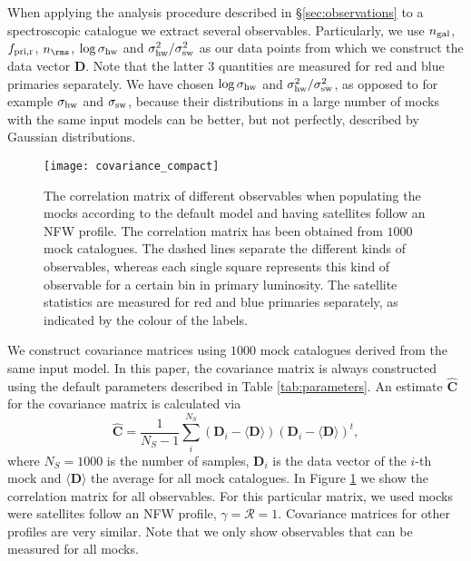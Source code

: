 \documentclass[fleqn,usenatbib,useAMS]{mnras}
\begin{document}
	When applying the analysis procedure described in \S\ref{sec:observations} to a spectroscopic catalogue we extract several observables. Particularly, we use $n_{\rm gal}$, $f_{\rm pri, r}$, $n_\rms$, $\log \sigma_{\rm hw}$ and $\sigma_{\rm hw}^2 / \sigma_{\rm sw}^2$ as our data points from which we construct the data vector $\boldsymbol{D}$. Note that the latter $3$ quantities are measured for red and blue primaries separately. We have chosen $\log \sigma_{\rm hw}$ and $\sigma_{\rm hw}^2 / \sigma_{\rm sw}^2$, as opposed to for example $\sigma_{\rm hw}$ and $\sigma_{\rm sw}$, because their distributions in a large number of mocks with the same input models can be better, but not perfectly, described by Gaussian distributions.
	\begin{figure}
		\centering
		\texttt{[image: covariance\_compact]}
		\caption{The correlation matrix of different observables when populating the mocks according to the default model and having satellites follow an NFW profile. The correlation matrix has been obtained from $1000$ mock catalogues. The dashed lines separate the different kinds of observables, whereas each single square represents this kind of observable for a certain bin in primary luminosity. The satellite statistics are measured for red and blue primaries separately, as indicated by the colour of the labels.}
		\label{fig:covariance}
	\end{figure}
	
	We construct covariance matrices using $1000$ mock catalogues derived from the same input model. In this paper, the covariance matrix is always constructed using the default parameters described in Table \ref{tab:parameters}. An estimate $\boldsymbol{\hat{C}}$ for the covariance matrix is calculated via
	\begin{equation}
	\boldsymbol{\hat{C}} = \frac{1}{N_S - 1} \sum_i^{N_S} (\boldsymbol{D}_i - \langle \boldsymbol{D} \rangle) (\boldsymbol{D}_i - \langle \boldsymbol{D} \rangle)^t,
	\end{equation}
	where $N_S = 1000$ is the number of samples, $\boldsymbol{D}_i$ is the data vector of the $i$-th mock and $\langle \boldsymbol{D} \rangle$ the average for all mock catalogues. In Figure \ref{fig:covariance} we show the correlation matrix for all observables. For this particular matrix, we used mocks were satellites follow an NFW profile, $\gamma = \mathcal{R} = 1$. Covariance matrices for other profiles are very similar. Note that we only show observables that can be measured for all mocks.
	
\end{document}
